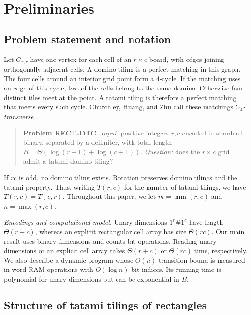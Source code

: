 \documentclass[11pt, reqno]{amsart}
\theoremstyle{definition}
\theoremstyle{remark}
\numberwithin{equation}{section}
\begin{document}
\section{Preliminaries}
\label{sec:preliminaries}

\subsection{Problem statement and notation}
\label{sec:problem}

Let $G_{r,c}$ have one vertex for each cell of an $r\times c$ board, with
edges joining orthogonally adjacent cells. A domino tiling is a perfect
matching in this graph. The four cells around an interior grid point
form a 4-cycle. If the matching uses an edge of this cycle, two of the
cells belong to the same domino. Otherwise four distinct tiles meet at
the point. A tatami tiling is therefore a perfect matching that meets
every such cycle. Churchley, Huang, and Zhu call these matchings
\emph{$C_4$-transverse} \cite{churchley,er13}.

\begin{quote}
    \textbf{Problem RECT-DTC.} \emph{Input:} positive integers $r, c$ encoded
    in standard binary, separated by a delimiter, with total length
    $B=\Theta(\log(r+1)+\log(c+1))$.
    \emph{Question:} does the $r \times c$ grid admit a tatami domino tiling?
\end{quote}

If $rc$ is odd, no domino tiling exists. Rotation preserves domino
tilings and the tatami property. Thus, writing $T(r, c)$ for the number
of tatami tilings, we have $T(r, c) = T(c, r)$. Throughout this paper,
we let $m = \min(r, c)$ and $n = \max(r, c)$.

\emph{Encodings and computational model.} Unary dimensions
$1^r\#1^c$ have length $\Theta(r+c)$, whereas an explicit rectangular
cell array has size $\Theta(rc)$. Our main result uses binary dimensions
and counts bit operations. Reading unary dimensions or an explicit cell
array takes $\Theta(r+c)$ or $\Theta(rc)$ time, respectively.
We also describe a dynamic program whose
$O(n)$ transition bound is measured in
word-RAM operations with $O(\log n)$-bit indices. Its running time is
polynomial for unary dimensions but can be exponential in $B$.

\subsection{Structure of tatami tilings of rectangles}
\label{sec:structure}
\end{document}

